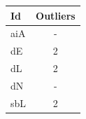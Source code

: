 \begin{tabular}{lc}
\toprule
Id & Outliers \\
\midrule
aiA & - \\
dE & 2 \\
dL & 2 \\
dN & - \\
sbL & 2 \\
\bottomrule
\end{tabular}
